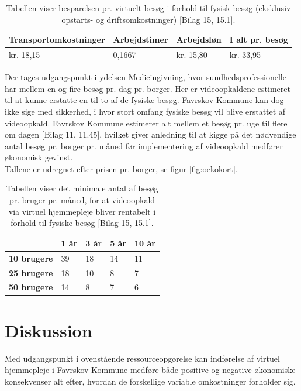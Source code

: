 \begin{table}[H]
	\caption{Tabellen viser besparelsen pr. virtuelt besøg i forhold til fysisk besøg (eksklusiv opstarts- og driftsomkostninger) [Bilag 15, 15.1].}
	\centering
	\label{tab:tabelbesparelse}
	\begin{tabular}{|l|l|l|l|}
		\hline
		\textbf{Transportomkostninger} & \textbf{Arbejdstimer } & \textbf{Arbejdsløn \cite{foa}} & \textbf{I alt pr. besøg}\\ \hline
		kr. 18,15 & 0,1667 & kr. 15,80 & kr. 33,95\\ \hline
	\end{tabular}
\end{table}

Der tages udgangspunkt i ydelsen Medicingivning, hvor sundhedsprofessionelle har mellem en og fire besøg pr. dag pr. borger. Her er videoopkaldene estimeret til at kunne erstatte en til to af de fysiske besøg. Favrskov Kommune kan dog ikke sige med sikkerhed, i hvor stort omfang fysiske besøg vil blive erstattet af videoopkald. Favrskov Kommune estimerer alt mellem et besøg pr. uge til flere om dagen [Bilag 11, 11.45], hvilket giver anledning til at kigge på det nødvendige antal besøg pr. borger pr. måned før implementering af videoopkald medfører økonomisk gevinst.\\
Tallene er udregnet efter prisen pr. borger, se figur \ref{fig:oekokort}.

\begin{table}[H]
	\caption{Tabellen viser det minimale antal af besøg pr. bruger pr. måned, for at videoopkald via virtuel hjemmepleje bliver rentabelt i forhold til fysiske besøg [Bilag 15, 15.1].}
	\centering
	\label{tab:tabelminimum}
	\begin{tabular}{|l|l|l|l|l|}
		\hline
		 & \textbf{1 år} & \textbf{3 år} & \textbf{5 år} & \textbf{10 år}\\ \hline
		\textbf{10 brugere} & 39 & 18 & 14 & 11\\ \hline
		\textbf{25 brugere} & 18 & 10 & 8 & 7\\ \hline
		\textbf{50 brugere} & 14 & 8 & 7 & 6\\ \hline
	\end{tabular}
\end{table}

\section{Diskussion}
Med udgangspunkt i ovenstående ressourceopgørelse kan indførelse af virtuel hjemmepleje i Favrskov Kommune medføre både positive og negative økonomiske konsekvenser alt efter, hvordan de forskellige variable omkostninger forholder sig. 


